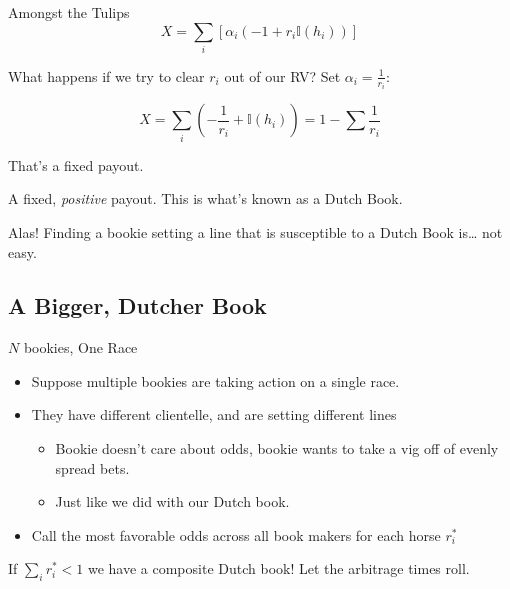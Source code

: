 \documentclass[pdf]{beamer}
\begin{document}
\begin{frame}{Amongst the Tulips}
  \[ X = \sum_i \left[ \alpha_i (-1 + r_i\mathbb{I}(h_i)) \right] \]

  What happens if we try to clear $r_i$ out of our RV? \pause Set $\alpha_i = \frac{1}{r_i}$:

  \[ X = \sum_i \left( -\frac{1}{r_i} + \mathbb{I}(h_i) \right) = 1 - \sum \frac{1}{r_i}\]

  \pause

  That's a fixed payout.\\

  \pause

  A fixed, \alert{\emph{positive}} payout. This is what's known as a Dutch Book.
\end{frame}

\begin{frame}{Alas!}
  Finding a bookie setting a line that is susceptible to a Dutch Book is\ldots
  not easy.
\end{frame}

\subsection{A Bigger, Dutcher Book}
\begin{frame}{$N$ bookies, One Race}
  \begin{itemize}
  \item Suppose multiple bookies are taking action on a single race.
  \pause\item They have different clientelle, and are setting different lines
    \begin{itemize}
    \item Bookie doesn't care about odds, bookie wants to take a vig off of evenly spread bets.
    \item Just like we did with our Dutch book.
    \end{itemize}
  \pause\item Call the most favorable odds across all book makers for each horse $r^*_i$
  \end{itemize}
  \pause
  If $ \sum_i r_i^* < 1 $ we have a composite Dutch book! Let the arbitrage
times roll.
\end{frame}
\end{document}
